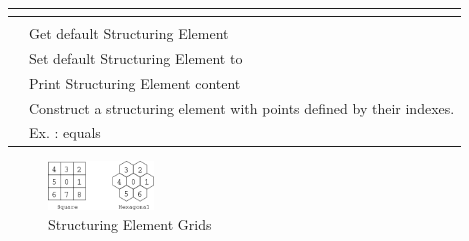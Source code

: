 %
%
%
\begin{table}[h!]
  \centering
  \begin{tabularx}{\linewidth}{|l|Y|}
    \toprule
                                  \\
    \toprule
                              &                                                       \\
    \hline \hline
           & Get default Structuring Element                                       \\
    \hline
      & Set default Structuring Element to                      \\
    \hline
                      & Print Structuring Element content                                     \\
    \hline
     & Construct a structuring element with points defined by their indexes. \\
                                           & Ex. :   equals          \\
    \hline
  \end{tabularx}
\end{table}

\begin{figure}[h!]
  \centering
  \includegraphics[width=0.25\textwidth]{images/SE_indexes.png}
  \caption*{Structuring Element Grids}
\end{figure}

